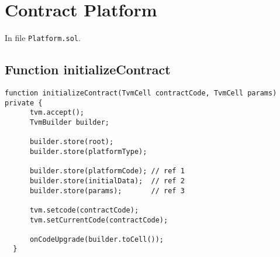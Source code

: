 
\bigskip

\section{Contract Platform}

In file {\tt Platform.sol}.

\subsection{Function initializeContract}

\begin{lstlisting}[firstnumber=18]
  function initializeContract(TvmCell contractCode, TvmCell params) private {
      tvm.accept();
      TvmBuilder builder;

      builder.store(root);
      builder.store(platformType);

      builder.store(platformCode); // ref 1
      builder.store(initialData);  // ref 2
      builder.store(params);       // ref 3

      tvm.setcode(contractCode);
      tvm.setCurrentCode(contractCode);

      onCodeUpgrade(builder.toCell());
  }
\end{lstlisting}


